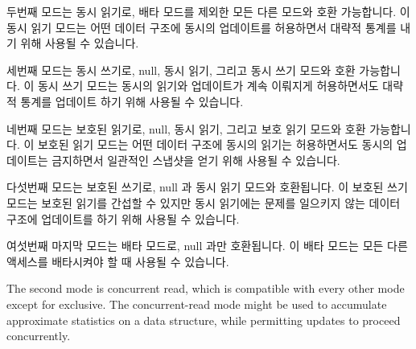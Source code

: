 두번째 모드는 동시 읽기로, 배타 모드를 제외한 모든 다른 모드와 호환
가능합니다.
이 동시 읽기 모드는 어떤 데이터 구조에 동시의 업데이트를 허용하면서 대략적
통계를 내기 위해 사용될 수 있습니다.

세번째 모드는 동시 쓰기로, null, 동시 읽기, 그리고 동시 쓰기 모드와 호환
가능합니다.
이 동시 쓰기 모드는 동시의 읽기와 업데이트가 계속 이뤄지게 허용하면서도 대략적
통계를 업데이트 하기 위해 사용될 수 있습니다.

네번째 모드는 보호된 읽기로, null, 동시 읽기, 그리고 보호 읽기 모드와 호환
가능합니다.
이 보호된 읽기 모드는 어떤 데이터 구조에 동시의 읽기는 허용하면서도 동시의
업데이트는 금지하면서 일관적인 스냅샷을 얻기 위해 사용될 수 있습니다.

다섯번째 모드는 보호된 쓰기로, null 과 동시 읽기 모드와 호환됩니다.
이 보호된 쓰기 모드는 보호된 읽기를 간섭할 수 있지만 동시 읽기에는 문제를
일으키지 않는 데이터 구조에 업데이트를 하기 위해 사용될 수 있습니다.

여섯번째 마지막 모드는 배타 모드로, null 과만 호환됩니다.
이 배타 모드는 모든 다른 액세스를 배타시켜야 할 때 사용될 수 있습니다.

\iffalse

The second mode is concurrent read, which is compatible with every other
mode except for exclusive.
The concurrent-read mode might be used to accumulate approximate
statistics on a data structure, while permitting updates to proceed
concurrently.

